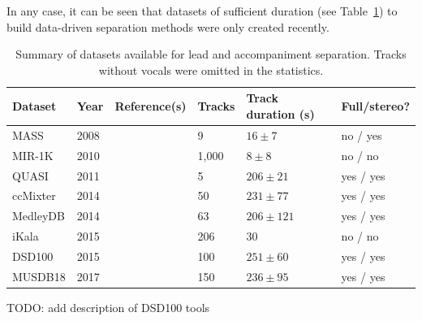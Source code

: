 In any case, it can be seen that datasets of sufficient duration (see Table~\ref{tab:datasets}) to build data-driven separation methods were only created recently.

\begin{table}[htbp]
	\centering
	\caption{Summary of datasets available for lead and accompaniment separation. Tracks without vocals were omitted in the statistics.}
	\label{tab:datasets}
		\begin{tabular}{l l l l l l}
			\hline
			\textbf{Dataset} & \textbf{Year} & \textbf{Reference(s)} & \textbf{Tracks} & \textbf{Track duration (s)} & \textbf{Full/stereo?}\\
			\hline
			MASS & 2008 & \cite{MTGMASSdb} & 9 & $16 \pm 7$ & no / yes \\
			MIR-1K & 2010 & \cite{hsu10} & 1,000 & $8 \pm 8$ & no / no \\
			QUASI & 2011 & \cite{liutkus11,vincent12} & 5 & $206 \pm 21$ & yes / yes \\
			ccMixter & 2014 & \cite{liutkus142} & 50 & $231 \pm 77 $ & yes / yes \\
			MedleyDB & 2014 & \cite{bittner14} & 63 & $206 \pm 121$ & yes / yes \\
			iKala & 2015 & \cite{chan15} & 206 & 30 & no / no \\
			DSD100 & 2015 & \cite{ono15} & 100 & $251 \pm 60$ & yes / yes \\
      MUSDB18 & 2017 & \cite{rafii17} & 150 & $236 \pm 95$ & yes / yes \\
			\hline
		\end{tabular}
\end{table}

TODO: add description of DSD100 tools













